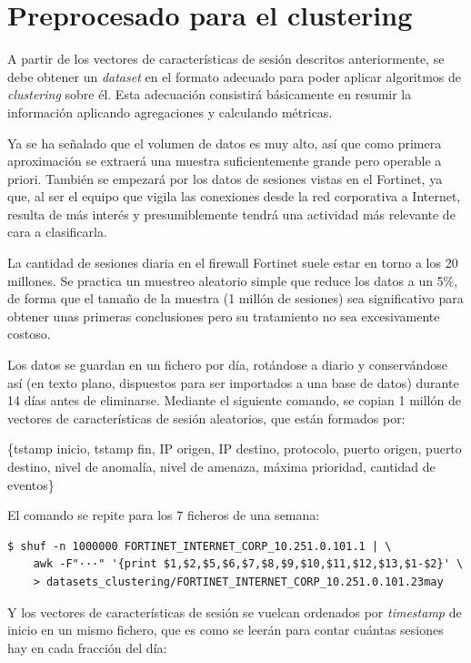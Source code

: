 \section{Preprocesado para el clustering}\label{sec:preprocesado}

A partir de los vectores de características de sesión descritos anteriormente, se debe obtener un \emph{dataset} en el formato adecuado para poder aplicar algoritmos de \emph{clustering} sobre él.
Esta adecuación consistirá básicamente en resumir la información aplicando agregaciones y calculando métricas.

Ya se ha señalado que el volumen de datos es muy alto, así que como primera aproximación se extraerá una muestra suficientemente grande pero operable a priori.
También se empezará por los datos de sesiones vistas en el Fortinet, ya que, al ser el equipo que vigila las conexiones desde la red corporativa a Internet,
resulta de más interés y presumiblemente tendrá una actividad más relevante de cara a clasificarla.

La cantidad de sesiones diaria en el firewall Fortinet suele estar en torno a los 20 millones.
Se practica un muestreo aleatorio simple que reduce los datos a un 5\%,
de forma que el tamaño de la muestra (1 millón de sesiones) sea significativo para obtener unas primeras conclusiones pero su tratamiento no sea excesivamente costoso.

Los datos se guardan en un fichero por día, rotándose a diario y conservándose así (en texto plano, dispuestos para ser importados a una base de datos) durante 14 días antes de eliminarse.
Mediante el siguiente comando, se copian 1 millón de vectores de características de sesión aleatorios, que están formados por:

\{tstamp inicio, tstamp fin, IP origen, IP destino, protocolo, puerto origen, puerto destino, nivel de anomalía, nivel de amenaza, máxima prioridad, cantidad de eventos\}

El comando se repite para los 7 ficheros de una semana:

\begin{verbatim}
$ shuf -n 1000000 FORTINET_INTERNET_CORP_10.251.0.101.1 | \
    awk -F"···" '{print $1,$2,$5,$6,$7,$8,$9,$10,$11,$12,$13,$1-$2}' \
    > datasets_clustering/FORTINET_INTERNET_CORP_10.251.0.101.23may
\end{verbatim}

Y los vectores de características de sesión se vuelcan ordenados por \emph{timestamp} de inicio en un mismo fichero, que es como se leerán para contar cuántas sesiones hay en cada fracción del día:


